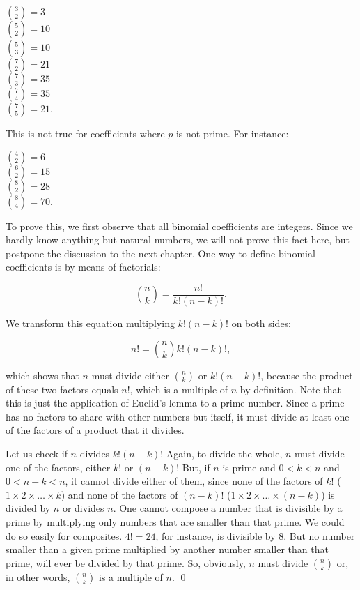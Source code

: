 \documentclass{scrreprt}
\begin{document}
$\binom{3}{2} = 3$\\
$\binom{5}{2} = 10$\\
$\binom{5}{3} = 10$\\
$\binom{7}{2} = 21$\\
$\binom{7}{3} = 35$\\
$\binom{7}{4} = 35$\\
$\binom{7}{5} = 21$.

This is not true for coefficients
where $p$ is not prime. For instance:

$\binom{4}{2} = 6$\\
$\binom{6}{2} = 15$\\
$\binom{8}{2} = 28$\\
$\binom{8}{4} = 70$.

To prove this, we first observe
that all binomial coefficients are integers.
Since we hardly know anything but natural numbers,
we will not prove this fact here,
but postpone the discussion to the next chapter.
One way to define binomial coefficients 
is by means of factorials:

\begin{equation}\label{eqCon_binom1}
\binom{n}{k} = \frac{n!}{k!(n-k)!}.
\end{equation}

We transform this equation 
multiplying $k!(n-k)!$ on both sides:

\begin{equation}
n! = \binom{n}{k} k!(n-k)!,
\end{equation}

which shows that $n$ must divide
either $\binom{n}{k}$ or $k!(n-k)!$,
because the product of these two factors
equals $n!$, which is a multiple of $n$ by definition.
Note that this is just the application
of Euclid's lemma to a prime number.
Since a prime has no factors to share
with other numbers but itself,
it must divide at least one of the factors
of a product that it divides.

Let us check if $n$ divides $k!(n-k)!$
Again, to divide the whole, $n$ must divide one of the factors,
either $k!$ or $(n-k)!$
But, if $n$ is prime and 
$0 < k < n$ and $0 < n - k < n$,
it cannot divide either of them,
since 
none of the factors of $k!$ 
($1 \times 2 \times \dots \times k$)
and none of the factors of $(n-k)!$
($1 \times 2 \times \dots \times (n-k)$)
is divided by $n$ or divides $n$.
One cannot compose a number that is divisible by a prime
by multiplying only numbers that are smaller than that prime.
We could do so easily for composites. 
$4! = 24$, for instance, is divisible by 8.
But no number smaller than a given prime
multiplied by another number smaller than that prime,
will ever be divided by that prime.
So, obviously, $n$ must divide $\binom{n}{k}$ or,
in other words, $\binom{n}{k}$ is a multiple of $n$. \qed
\end{document}
